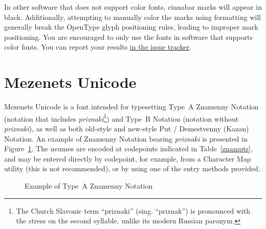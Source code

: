 \documentclass[11pt]{article}
\begin{document}
In other software that does not support color fonts, cinnabar marks will appear in black.
Additionally, attempting to manually color the marks using formatting will generally
break the OpenType glyph positioning rules, leading to improper mark positioning.
You are encouraged to only use the fonts in software that supports color fonts. You
can report your results \href{https://github.com/slavonic/fonts-znam/issues/19}{in
the issue tracker}.

\section{Mezenets Unicode}

Mezenets Unicode is a font intended for typesetting Type~A Znamenny Notation (notation
that includes \emph{priznaki}\footnote{The Church Slavonic term ``priznaki''
(sing. ``priznak'') is pronounced with the stress on the second syllable,
unlike its modern Russian paronym.}) and Type~B Notation (notation without
\emph{priznaki}), as well as both old-style and new-style Put / Demestvenny (Kazan) Notation.
An example of Znamenny Notation bearing \emph{priznaki} is presented in Figure~\ref{mezenets}. 
The neumes are encoded at codepoints indicated in Table~\ref{znampts},
and may be entered directly by codepoint, for example, from a Character Map
utility (this is not recommended), or by using one of the entry methods provided.

\begin{figure}[tbp]
\centering
\begin{minipage}{0.75\textwidth}
\begin{churchslavonic}
\noindent
\Large
{}
\end{churchslavonic}
\end{minipage}
\caption{Example of Type~A Znamenny Notation \label{mezenets}}
\end{figure}
\end{document}
